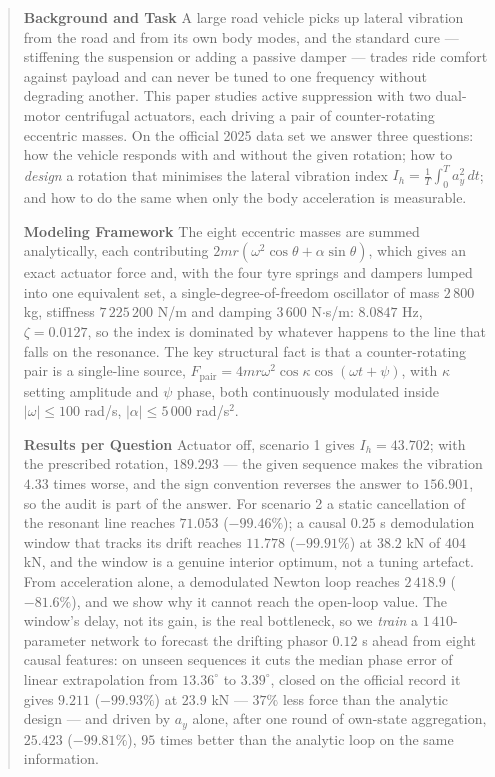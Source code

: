 \documentclass[12pt]{apmcmthesis}
\begin{document}
\thispagestyle{empty}
\begin{abstract}
\textbf{Background and Task} A large road vehicle picks up lateral vibration from the road and
from its own body modes, and the standard cure --- stiffening the suspension or adding a passive
damper --- trades ride comfort against payload and can never be tuned to one frequency without
degrading another. This paper studies active suppression with two dual-motor centrifugal actuators,
each driving a pair of counter-rotating eccentric masses. On the official 2025 data set we answer
three questions: how the vehicle responds with and without the given rotation; how to
\emph{design} a rotation that minimises the lateral vibration index
$I_h=\frac1T\int_0^T a_y^2\,dt$; and how to do the same when only the body acceleration is
measurable.

\textbf{Modeling Framework} The eight eccentric masses are summed analytically, each contributing
$2mr(\omega^2\cos\theta+\alpha\sin\theta)$, which gives an exact actuator force and, with the four
tyre springs and dampers lumped into one equivalent set, a single-degree-of-freedom oscillator of
mass $2\,800$ kg, stiffness $7\,225\,200$ N/m and damping $3\,600$ N$\cdot$s/m: $8.0847$ Hz,
$\zeta=0.0127$, so the index is dominated by whatever happens to the line that falls on the
resonance. The key structural fact is that a counter-rotating pair is a single-line source,
$F_{\text{pair}}=4mr\omega^2\cos\kappa\cos(\omega t+\psi)$, with $\kappa$ setting amplitude and
$\psi$ phase, both continuously modulated inside $|\omega|\le100$ rad/s, $|\alpha|\le5\,000$
rad/s$^2$.

\textbf{Results per Question} Actuator off, scenario 1 gives $I_h=43.702$; with the prescribed
rotation, $189.293$ --- the given sequence makes the vibration $4.33$ times worse, and the sign
convention reverses the answer to $156.901$, so the audit is part of the answer. For scenario 2 a
static cancellation of the resonant line reaches $71.053$ ($-99.46\%$); a causal $0.25$ s
demodulation window that tracks its drift reaches $11.778$ ($-99.91\%$) at $38.2$ kN of $404$ kN,
and the window is a genuine interior optimum, not a tuning artefact. From acceleration alone, a
demodulated Newton loop reaches $2\,418.9$ ($-81.6\%$), and we show why it cannot reach the
open-loop value. The window's delay, not its gain, is the real bottleneck, so we \emph{train} a
$1\,410$-parameter network to forecast the drifting phasor $0.12$ s ahead from eight causal
features: on unseen sequences it cuts the median phase error of linear extrapolation from
$13.36^\circ$ to $3.39^\circ$, closed on the official record it gives $9.211$ ($-99.93\%$) at
$23.9$ kN --- $37\%$ less force than the analytic design --- and driven by $a_y$ alone, after one
round of own-state aggregation, $25.423$ ($-99.81\%$), $95$ times better than the analytic loop on
the same information.


\end{abstract}
\end{document}

